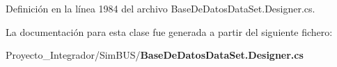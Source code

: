 Definición en la línea 1984 del archivo Base\-De\-Datos\-Data\-Set.\-Designer.\-cs.



La documentación para esta clase fue generada a partir del siguiente fichero\-:\begin{DoxyCompactItemize}
\item 
Proyecto\-\_\-\-Integrador/\-Sim\-B\-U\-S/{\bf Base\-De\-Datos\-Data\-Set.\-Designer.\-cs}\end{DoxyCompactItemize}
